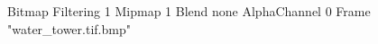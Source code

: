 {Bitmap
	{Filtering 1}
	{Mipmap 1}
	{Blend none}
	{AlphaChannel 0}
	{Frame "water_tower.tif.bmp"}
}
